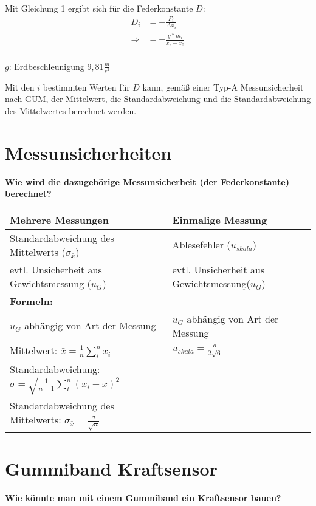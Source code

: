 \documentclass[a4paper, 12pt]{article}
\begin{document}
Mit Gleichung 1 ergibt sich für die Federkonstante $D$:
\begin{equation}
	\begin{split}
		D_i &= -\frac{F_i}{\Delta x_i}\\
		\Rightarrow  &=-\frac{g*m_i}{x_i-x_0}\\
	\end{split}
\end{equation}

\noindent $g$: Erdbeschleunigung $9,81\frac{m}{s^2}$

Mit den $i$ bestimmten Werten für $D$ kann, gemäß einer Typ-A Messunsicherheit nach GUM, der Mittelwert, die Standardabweichung und die Standardabweichung des Mittelwertes berechnet werden. 

\newpage
\section{Messunsicherheiten}
\textbf{Wie wird die dazugehörige Messunsicherheit (der Federkonstante) berechnet?}
\begin{table}[h]
	\centering
	\begin{tabular}{|l|l|}
		\hline
		\textbf{Mehrere Messungen} & \textbf{Einmalige Messung}\\
		\hline
		Standardabweichung des Mittelwerts ($\sigma_{\bar{x}}$) & Ablesefehler ($u_{skala}$)\\
		evtl. Unsicherheit aus Gewichtsmessung ($u_G$)& evtl. Unsicherheit aus Gewichtsmessung($u_G$)\\
		\hline
		\multicolumn{1}{|l}{\textbf{Formeln:}}& \\
		\hline
		$u_G$ abhängig von Art der Messung & $u_G$ abhängig von Art der Messung\\
		\hline
		Mittelwert: $\bar{x} = \frac {1}{n}\sum_{i}^n x_i$ &  $u_{skala} = \frac {a}{2\sqrt{6}}$\\
		\hline
		Standardabweichung: $\sigma = \sqrt{\frac{1}{n-1}\sum_{i}^n (x_i - \bar{x})^2}$ &  \\
		\hline
		Standardabweichung des Mittelwerts: $\sigma_{\bar{x}}= \frac{\sigma}{\sqrt{n}}$ & \\
		\hline
	\end{tabular}
\end{table}

\section{Gummiband Kraftsensor}
\textbf{Wie könnte man mit einem Gummiband ein Kraftsensor bauen?}
\end{document}
